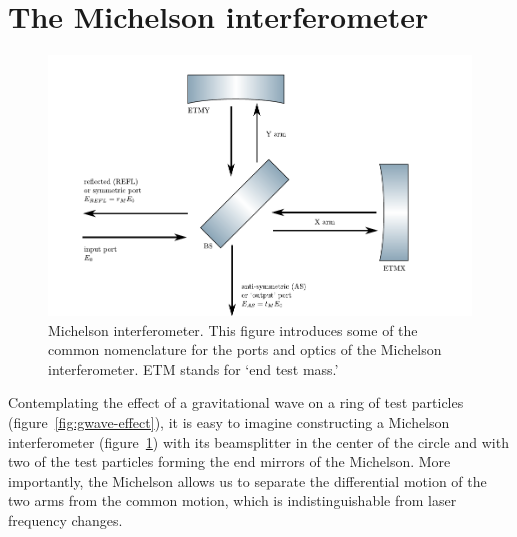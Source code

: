 \section{The Michelson interferometer}
\begin{figure}
\centering\includegraphics{figures/michelson.pdf}
\caption[Michelson interferometer]{\label{fig:michelson}Michelson
  interferometer.  This figure introduces some of the common
  nomenclature for the ports and optics of the Michelson
  interferometer.  ETM stands for `end test mass.'}
\end{figure}

Contemplating the effect of a gravitational wave on a ring of test
particles (figure~\ref{fig:gwave-effect}), it is easy to imagine
constructing a Michelson interferometer (figure~\ref{fig:michelson})
with its beamsplitter in the center of the circle and with two of the
test particles forming the end mirrors of the Michelson.  More
importantly, the Michelson allows us to separate the differential
motion of the two arms from the common motion, which is
indistinguishable from laser frequency changes.

